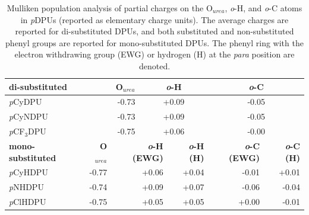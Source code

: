 \begin{table}[]
\centering
\caption{Mulliken population analysis of partial charges on the O$_{urea}$, \textit{o}-H, and \textit{o}-C atoms in \textit{p}DPUs (reported as elementary charge units). The average charges are reported for di-substituted DPUs, and both substituted and non-substituted phenyl groups are reported for mono-substituted DPUs. The phenyl ring with the electron withdrawing group (EWG) or hydrogen (H) at the \textit{para} position are denoted.} \label{tab:mulliken}
\begin{tabular}{lrrcrcr}
\textbf{di-substituted} & \multicolumn{2}{r}{\textbf{O$_{urea}$}} & \multicolumn{2}{c}{\textbf{\textit{o}-H}} & \multicolumn{2}{c}{\textbf{\textit{o}-C}} \\ \hline
\textit{p}CyDPU & \multicolumn{2}{r}{-0.73} & \multicolumn{2}{c}{+0.09} & \multicolumn{2}{c}{-0.05} \\
\textit{p}CyNDPU & \multicolumn{2}{r}{-0.73} & \multicolumn{2}{c}{+0.09} & \multicolumn{2}{c}{-0.05} \\
\textit{p}CF$_{3}$DPU & \multicolumn{2}{r}{-0.75} & \multicolumn{2}{c}{+0.06} & \multicolumn{2}{c}{-0.00} \\ \hline
\textbf{mono-substituted} & \textbf{O$_{urea}$} & \multicolumn{2}{r}{\textbf{\textit{o}-H   (EWG)}} & \textbf{\textit{o}-H   (H)} & \multicolumn{1}{r}{\textbf{\textit{o}-C (EWG)}} & \textbf{\textit{o}-C (H)} \\ \hline
\textit{p}CyHDPU & -0.77 & \multicolumn{2}{r}{+0.06} & +0.04 & \multicolumn{1}{r}{-0.01} & +0.01 \\
\textit{p}NHDPU & -0.74 & \multicolumn{2}{r}{+0.09} & +0.07 & \multicolumn{1}{r}{-0.06} & -0.04 \\
\textit{p}ClHDPU & -0.75 & \multicolumn{2}{r}{+0.05} & +0.05 & \multicolumn{1}{r}{+0.00} & -0.01 \\ \hline
\end{tabular}
\end{table}


